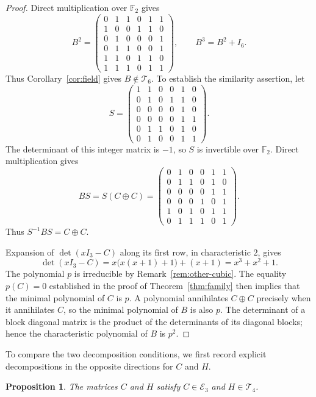\documentclass[12pt]{amsart}
\newtheorem{proposition}[theorem]{Proposition}
\theoremstyle{remark}
\numberwithin{equation}{section}
\theoremstyle{definition}
\newcommand{\F}{\mathbb F}
\newcommand{\Id}{I}
\newcommand{\TS}{\mathcal T}
\newcommand{\IC}{\mathcal E}
\begin{document}
\begin{proof}
Direct multiplication over $\F_2$ gives
\[
 B^2=\begin{pmatrix}
 0&1&1&0&1&1\\
 1&0&0&1&1&0\\
 0&1&0&0&0&1\\
 0&1&1&0&0&1\\
 1&1&0&1&1&0\\
 1&1&1&0&1&1
 \end{pmatrix},\qquad
 B^3=B^2+\Id_6.
\]
Thus Corollary~\ref{cor:field} gives $B\notin\TS_6$. To establish the similarity assertion, let
\[
 S=\begin{pmatrix}
 1&1&0&0&1&0\\
 0&1&0&1&1&0\\
 0&0&0&0&1&0\\
 0&0&0&0&1&1\\
 0&1&1&0&1&0\\
 0&1&0&0&1&1
 \end{pmatrix}.
\]
The determinant of this integer matrix is $-1$, so $S$ is invertible over $\F_2$. Direct multiplication gives
\[
 BS=S(C\oplus C)=
 \begin{pmatrix}
 0&1&0&0&1&1\\
 0&1&1&0&1&0\\
 0&0&0&0&1&1\\
 0&0&0&1&0&1\\
 1&0&1&0&1&1\\
 0&1&1&1&0&1
 \end{pmatrix}.
\]
Thus $S^{-1}BS=C\oplus C$.

Expansion of $\det(x\Id_3-C)$ along its first row, in characteristic $2$, gives
\[
 \det(x\Id_3-C)=x\bigl(x(x+1)+1\bigr)+(x+1)=x^3+x^2+1.
\]
The polynomial $p$ is irreducible by Remark~\ref{rem:other-cubic}. The equality $p(C)=0$ established in the proof of Theorem~\ref{thm:family} then implies that the minimal polynomial of $C$ is $p$. A polynomial annihilates $C\oplus C$ precisely when it annihilates $C$, so the minimal polynomial of $B$ is also $p$. The determinant of a block diagonal matrix is the product of the determinants of its diagonal blocks; hence the characteristic polynomial of $B$ is $p^2$.
\end{proof}

To compare the two decomposition conditions, we first record explicit decompositions in the opposite directions for $C$ and $H$.

\begin{proposition}\label{prop:positive}
The matrices $C$ and $H$ satisfy $C\in\IC_3$ and $H\in\TS_4$.
\end{proposition}
\end{document}
